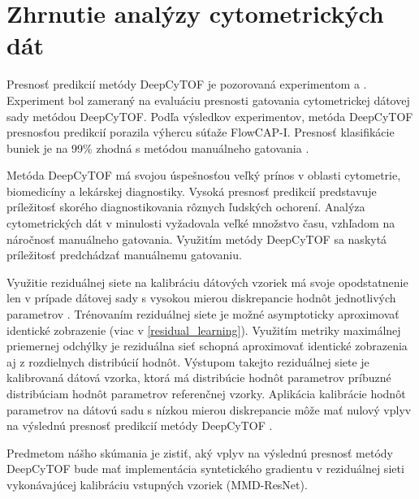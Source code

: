\section{Zhrnutie analýzy cytometrických dát}

Presnosť predikcií metódy DeepCyTOF je pozorovaná experimentom \cite{Li2017} a \cite{Li2016}. Experiment bol zameraný na evaluáciu presnosti gatovania cytometrickej dátovej sady metódou DeepCyTOF. Podľa výsledkov experimentov, metóda DeepCyTOF presnosťou predikcií porazila výhercu súťaže FlowCAP-I. Presnosť klasifikácie buniek je na 99\% zhodná s metódou manuálneho gatovania \cite{Li2016}.

Metóda DeepCyTOF má svojou úspešnosťou veľký prínos v oblasti cytometrie, biomedicíny a lekárskej diagnostiky. Vysoká presnosť predikcií predstavuje príležitosť skorého diagnostikovania rôznych ľudských ochorení. Analýza cytometrických dát v minulosti vyžadovala veľké množstvo času, vzhľadom na náročnosť manuálneho gatovania. Využitím metódy DeepCyTOF sa naskytá príležitosť predchádzať manuálnemu gatovaniu.

Využitie reziduálnej siete na kalibráciu dátových vzoriek má svoje opodstatnenie len v prípade dátovej sady s vysokou mierou diskrepancie hodnôt jednotlivých parametrov \cite{Li2017}. Trénovaním reziduálnej siete je možné asymptoticky aproximovať identické zobrazenie (viac v \ref{residual_learning}). Využitím metriky maximálnej priemernej odchýlky je reziduálna sieť schopná aproximovať identické zobrazenia aj z rozdielnych distribúcií hodnôt. Výstupom takejto reziduálnej siete je kalibrovaná dátová vzorka, ktorá má distribúcie hodnôt parametrov príbuzné distribúciam hodnôt parametrov referenčnej vzorky. Aplikácia kalibrácie hodnôt parametrov na dátovú sadu s nízkou mierou diskrepancie môže mať nulový vplyv na výslednú presnosť predikcií metódy DeepCyTOF \cite{Li2017}.

Predmetom nášho skúmania je zistiť, aký vplyv na výslednú presnosť metódy DeepCyTOF bude mať implementácia syntetického gradientu v reziduálnej sieti vykonávajúcej kalibráciu vstupných vzoriek (MMD-ResNet).
